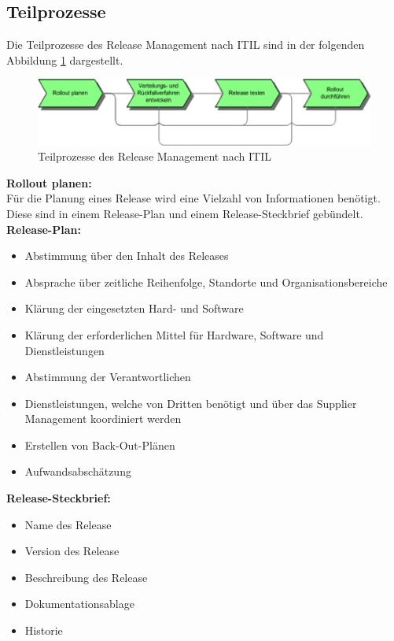 \subsection{Teilprozesse}
Die Teilprozesse des Release Management nach ITIL sind in der folgenden Abbildung \ref{fig:tp} dargestellt. 
\begin{figure}[H]
	\includegraphics[width=\textwidth]{img/Teilprozesse.png}
	\caption{Teilprozesse des Release Management nach ITIL \cite{}}
	\label{fig:tp}
\end{figure}
\textbf{Rollout planen:}
\\
Für die Planung eines Release wird eine Vielzahl von Informationen benötigt. Diese sind in einem Release-Plan und einem Release-Steckbrief gebündelt.
\\
\textbf{Release-Plan:}
\begin{itemize}
	\item Abstimmung über den Inhalt des Releases
	\item Absprache über zeitliche Reihenfolge, Standorte und Organisationsbereiche
	\item Klärung der eingesetzten Hard- und Software
	\item Klärung der erforderlichen Mittel für Hardware, Software und Dienstleistungen
	\item Abstimmung der Verantwortlichen
	\item Dienstleistungen, welche von Dritten benötigt und über das Supplier Management koordiniert werden
	\item Erstellen von Back-Out-Plänen
	\item Aufwandsabschätzung
\end{itemize}
\textbf{Release-Steckbrief:}
\begin{itemize}
	\item Name des Release
	\item Version des Release
	\item Beschreibung des Release
	\item Dokumentationsablage
	\item Historie
\end{itemize}

